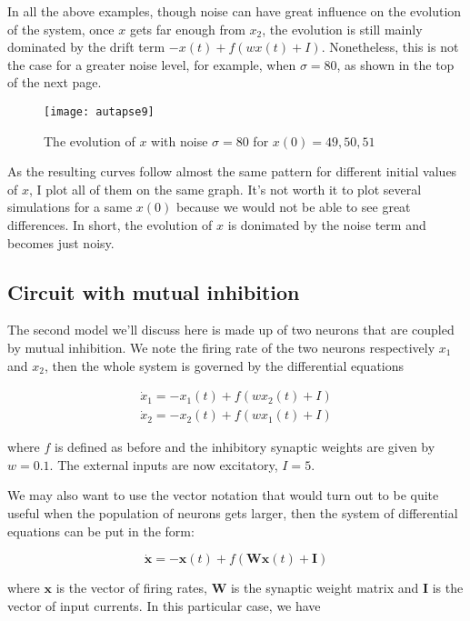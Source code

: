 In all the above examples, though noise can have great influence on the 
evolution of the system, once $x$ gets far enough from $x_2$, the evolution
is still mainly dominated by the drift term $-x(t) + f(wx(t)+I)$.
Nonetheless, this is not the case for a greater noise level, for example,
when $\sigma = 80$, as shown in the top of the next page.

\vspace{-1em}
\begin{figure}[H]
  \centering
  \texttt{[image: autapse9]}
  \caption
    {The evolution of $x$ with noise $\sigma = 80$ for $x(0) = 49, 50, 51$}
\end{figure}

As the resulting curves follow almost the same pattern for different 
initial values of $x$, I plot all of them on the same graph. It's not worth
it to plot several simulations for a same $x(0)$ because we would not be able
to see great differences. In short, the evolution of $x$ is donimated by
the noise term and becomes just noisy.

\subsection{Circuit with mutual inhibition}

The second model we'll discuss here is made up of two neurons that are coupled
by mutual inhibition. We note the firing rate of the two neurons respectively
$x_1$ and $x_2$, then the whole system is governed by the differential
equations

\begin{gather*}
  \dot{x}_1 = -x_1(t) + f(wx_2(t) + I)\\
  \dot{x}_2 = -x_2(t) + f(wx_1(t) + I)
\end{gather*}

\noindent
where $f$ is defined as before and the inhibitory synaptic weights are given
by $w = 0.1$. The external inputs are now excitatory, $I = 5$.

We may also want to use the vector notation that would turn out to be quite
useful when the population of neurons gets larger, then the system of
differential equations can be put in the form:

\[\dot{\mathbf{x}} = -\mathbf{x}(t) + f(\mathbf{Wx}(t) + \mathbf{I})\]

\noindent
where $\mathbf{x}$ is the vector of firing rates, $\mathbf{W}$ is the synaptic 
weight matrix and $\mathbf{I}$ is the vector of input currents. In this
particular case, we have

